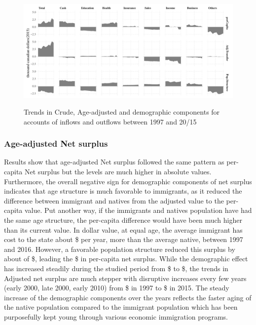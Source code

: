 \begin{figure}[H]%
  \caption{Trends in Crude, Age-adjusted and demographic components for accounts of inflows and outflows between 1997 and 20/15 }
  \includegraphics[width=1\textwidth]{res/DEcomp.pdf}%
  \label{fig:DEcomp}%
\end{figure}%

\subsubsection*{Age-adjusted Net surplus}

Results show that age-adjusted Net surplus followed the same pattern as per-capita Net surplus but the levels are much higher in absolute values.
Furthermore, the overall negative sign for demographic components of net surplus indicates that age structure is much favorable to immigrants, as it reduced the difference between immigrant and natives from the adjusted value to the per-capita value.
Put another way, if the immigrants and natives population have had the same age structure, the per-capita difference would have been much higher than its current value.
In dollar value, at equal age, the average immigrant has cost to the state about \$ per year, more than the average native, between 1997 and 2016.
However, a favorable population structure reduced this surplus by about of \$, leading the  \$ in per-capita net surplus.
While the demographic effect has increased steadily during the studied period from \$ to \$, the trends in Adjusted net surplus are much stepper with disruptive increases every few years (early 2000, late 2000, early 2010) from \$ in 1997 to \$ in 2015.
The steady increase of the demographic components over the years reflects the faster aging of the native population compared to the immigrant population which has been purposefully kept young through various economic immigration programs.

